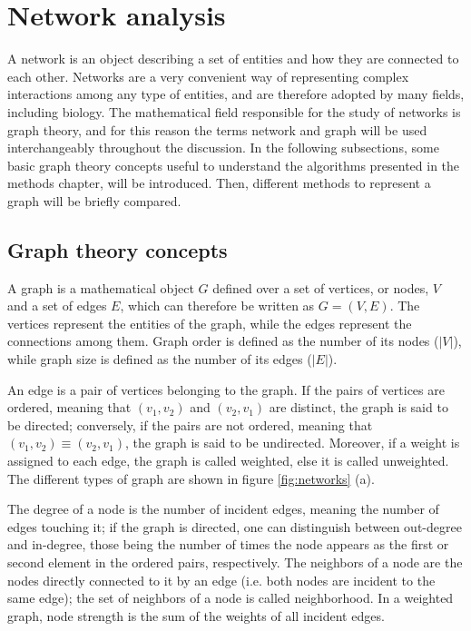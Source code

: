 \section{Network analysis}

A network is an object describing a set of entities and how they are connected to each other. Networks are a very convenient way of representing complex interactions among any type of entities, and are therefore adopted by many fields, including biology. The mathematical field responsible for the study of networks is graph theory, and for this reason the terms network and graph will be used interchangeably throughout the discussion. In the following subsections, some basic graph theory concepts useful to understand the algorithms presented in the methods chapter, will be introduced. Then, different methods to represent a graph will be briefly compared.

\subsection{Graph theory concepts}
A graph is a mathematical object $G$ defined over a set of vertices, or nodes, $V$ and a set of edges $E$, which can therefore be written as $G=(V,E)$. The vertices represent the entities of the graph, while the edges represent the connections among them. Graph order is defined as the number of its nodes ($|V|$), while graph size is defined as the number of its edges ($|E|$).

An edge is a pair of vertices belonging to the graph. If the pairs of vertices are ordered, meaning that $(v_1,v_2)$ and $(v_2, v_1)$ are distinct, the graph is said to be directed; conversely, if the pairs are not ordered, meaning that $(v_1,v_2) \equiv (v_2, v_1)$, the graph is said to be undirected. Moreover, if a weight is assigned to each edge, the graph is called weighted, else it is called unweighted. The different types of graph are shown in figure \ref{fig:networks} (a).

The degree of a node is the number of incident edges, meaning the number of edges touching it; if the graph is directed, one can distinguish between out-degree and in-degree, those being the number of times the node appears as the first or second element in the ordered pairs, respectively. The neighbors of a node are the nodes directly connected to it by an edge (i.e. both nodes are incident to the same edge); the set of neighbors of a node is called neighborhood. In a weighted graph, node strength is the sum of the weights of all incident edges. 

